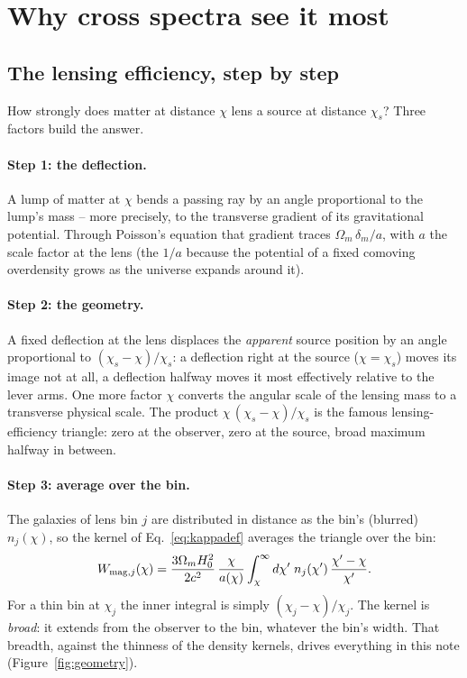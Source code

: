 \documentclass[11pt]{article}
\begin{document}
\section{Why cross spectra see it most}
\label{sec:cross}

\subsection{The lensing efficiency, step by step}
\label{sec:efficiency}

How strongly does matter at distance $\chi$ lens a source at distance
$\chi_s$?  Three factors build the answer.

\paragraph{Step 1: the deflection.}
A lump of matter at $\chi$ bends a passing ray by an angle
proportional to the lump's mass -- more precisely, to the transverse
gradient of its gravitational potential.  Through Poisson's equation
that gradient traces $\Omega_m\,\delta_m/a$, with $a$ the scale
factor at the lens (the $1/a$ because the potential of a fixed
comoving overdensity grows as the universe expands around it).

\paragraph{Step 2: the geometry.}
A fixed deflection at the lens displaces the \emph{apparent} source
position by an angle proportional to $(\chi_s - \chi)/\chi_s$: a
deflection right at the source ($\chi = \chi_s$) moves its image not
at all, a deflection halfway moves it most effectively relative to
the lever arms.  One more factor $\chi$ converts the angular scale of
the lensing mass to a transverse physical scale.  The product
$\chi\,(\chi_s - \chi)/\chi_s$ is the famous lensing-efficiency
triangle: zero at the observer, zero at the source, broad maximum
halfway in between.

\paragraph{Step 3: average over the bin.}
The galaxies of lens bin $j$ are distributed in distance as the bin's
(blurred) $n_j(\chi)$, so the kernel of Eq.~\eqref{eq:kappadef}
averages the triangle over the bin:
\begin{equation}
  W_{{\rm mag},j}(\chi)
  = \frac{3\Omega_m H_0^2}{2 c^2}\,
    \frac{\chi}{a(\chi)}
    \int_\chi^{\infty} d\chi'\; n_j(\chi')\,
    \frac{\chi' - \chi}{\chi'} .
  \label{eq:wmag}
\end{equation}
For a thin bin at $\chi_j$ the inner integral is simply
$(\chi_j - \chi)/\chi_j$.  The kernel is \emph{broad}: it extends
from the observer to the bin, whatever the bin's width.  That
breadth, against the thinness of the density kernels, drives
everything in this note (Figure~\ref{fig:geometry}).
\end{document}

